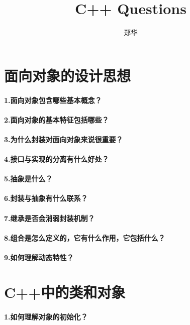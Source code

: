 \documentclass[UTF8,a4paper,8pt]{ctexart}
\author{郑华}
\title{C++  Questions }
\begin{document}
 	\maketitle
	
\section*{面向对象的设计思想}
	 \paragraph{1.面向对象包含哪些基本概念？}
	 \paragraph{2.面向对象的基本特征包括哪些？}
	 \paragraph{3.为什么封装对面向对象来说很重要？}
	 \paragraph{4.接口与实现的分离有什么好处？}
	 \paragraph{5.抽象是什么？}
	 \paragraph{6.封装与抽象有什么联系？}
	 \paragraph{7.继承是否会消弱封装机制？}
	 \paragraph{8.组合是怎么定义的，它有什么作用，它包括什么？}
	 \paragraph{9.如何理解动态特性？}
	 
\section*{C++中的类和对象}
	 \paragraph{1.如何理解对象的初始化？}
\end{document}
